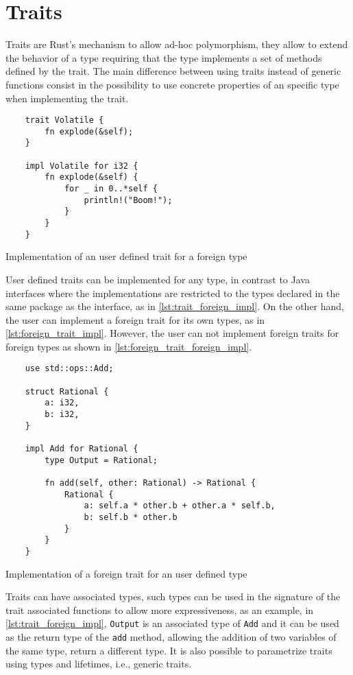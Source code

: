 \section{Traits}
Traits are Rust's mechanism to allow ad-hoc polymorphism, they allow to extend the behavior of a type requiring that the type implements a set of methods defined by the trait. The main difference between using traits instead of generic functions consist in the possibility to use concrete properties of an specific type when implementing the trait. \cite{traits}

\begin{listing}[ht]
	\begin{verbatim}
    trait Volatile {
        fn explode(&self);
    }

    impl Volatile for i32 {
        fn explode(&self) {
            for _ in 0..*self {
                println!("Boom!");
            }
        }
    }
    \end{verbatim}
  \caption{Implementation of an user defined trait for a foreign type}
  \label{lst:trait_foreign_impl}
\end{listing}

User defined traits can be implemented for any type, in contrast to Java interfaces where the implementations are restricted to the types declared in the same package as the interface, as in \ref{lst:trait_foreign_impl}. On the other hand, the user can implement a foreign trait for its own types, as in \ref{lst:foreign_trait_impl}. However, the user can not implement foreign traits for foreign types as shown in \ref{lst:foreign_trait_foreign_impl}.

\begin{listing}[ht]
	\begin{verbatim}
    use std::ops::Add;

    struct Rational {
        a: i32,
        b: i32,
    }

    impl Add for Rational {
        type Output = Rational;
        
        fn add(self, other: Rational) -> Rational {
            Rational {
                a: self.a * other.b + other.a * self.b,
                b: self.b * other.b
            }
        }
    }
    \end{verbatim}
  \caption{Implementation of a foreign trait for an user defined type}
  \label{lst:foreign_trait_impl}
\end{listing}

Traits can have associated types, such types can be used in the signature of the trait associated functions to allow more expressiveness, as an example, in \ref{lst:trait_foreign_impl}, \texttt{Output} is an associated type of \texttt{Add} and it can be used as the return type of the \texttt{add} method, allowing the addition of two variables of the same type, return a different type. It is also possible to parametrize traits using types and lifetimes, i.e., generic traits.

